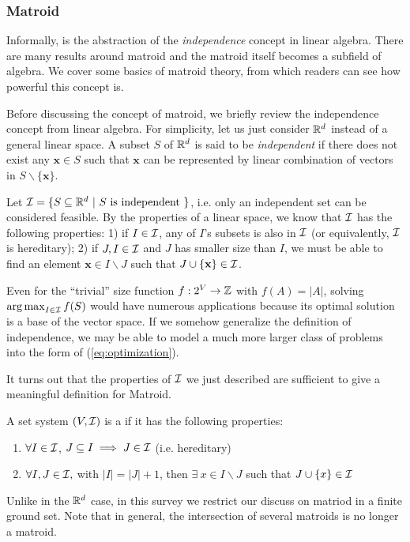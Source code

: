\subsubsection{Matroid}
Informally,   is the abstraction of the \emph{independence} concept in linear algebra. There are many results around matroid and the matroid itself becomes a subfield of algebra. We cover some basics of matroid theory, from which readers can see how powerful this concept is. 

Before discussing the concept of  matroid, we briefly review the independence concept from linear algebra. For simplicity, let us just consider $\mathbb{R}^d$ instead of a general linear space. A subset $S$ of $\mathbb{R}^d$ is said to be \emph{independent} if there does not exist any $\mathbf{x}\in S$ such that $\mathbf{x}$ can be represented by linear combination of vectors in $S\backslash\{\mathbf{x}\}$. 

Let $\mathcal{I} = \{S \subseteq \mathbb{R}^d~|~S ~\text{is independent}~\}$, i.e. only an independent set can be considered feasible. By the properties of a linear space, we know that $\mathcal{I}$ has the following properties: 1) if $I\in \mathcal{I}$, any of $I$'s subsets is also in $\mathcal{I}$ (or equivalently, $\mathcal{I}$ is hereditary); 2) if $J, I\in \mathcal{I}$ and $J$ has smaller size than $I$, we must be able to find an element  $\mathbf{x} \in I\backslash J$ such that $J\cup \{\mathbf{x}\} \in \mathcal{I}$. 

Even for the ``trivial'' size function $f: 2^V \rightarrow \mathbb{Z}$ with $f(A) = |A|$, solving $\operatorname*{arg\,max}_{I\in\mathcal{I}} f(S)$ would have numerous applications because its optimal solution is a base of the vector space.  If we somehow generalize the definition of independence, we may be able to model a much more larger class of problems into the form of (\ref{eq:optimization}). 

It turns out that the properties of $\mathcal{I}$ we just described are sufficient to give a meaningful definition for Matroid. 
\begin{definition}[Matroid]
\label{def:matroid}
  A set system $(V, \mathcal{I})$ is a  if it has the following properties:
  \begin{enumerate}
  \item $\forall I \in \mathcal{I}$, $J\subseteq I \implies J\in \mathcal{I}$ (i.e. hereditary)
  \item $\forall I, J \in \mathcal{I},$ with $|I| = |J| + 1$,  then $\exists~ x\in I\backslash J$ such that $J \cup \{x\}\in \mathcal{I}$ 
  \end{enumerate} 
\end{definition}
Unlike in the $\mathbb{R}^d$ case, in this survey we restrict our discuss on matriod in a finite ground set. Note that in general, the intersection of several matroids is no longer a matroid.


